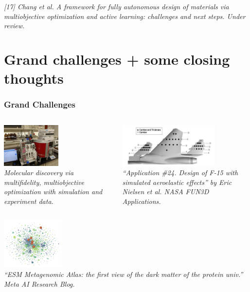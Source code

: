 \documentclass[aspectratio=169]{beamer}
\begin{document}
\begin{frame}
\vfill

{\tiny\it
[17] Chang et al.
A framework for fully autonomous design of materials via multiobjective optimization and active learning: challenges and next steps.
Under review.\\
}

\end{frame}

\section{Grand challenges + some closing thoughts}

\begin{frame}\frametitle{Grand Challenges}

\begin{columns}
\pause
\begin{column}{0.5\textwidth}
\begin{center}
\includegraphics[height=6em]{lab_setup.jpg}\\
{\tiny \sl
Molecular discovery via multifidelity, multiobjective optimization with
simulation and experiment data.\\
}
\end{center}
\end{column}
\pause
\begin{column}{0.5\textwidth}
\begin{center}
\includegraphics[height=6em]{../img/probs/nasa-f15.png}\\
{\tiny \sl
``Application \#24. Design of F-15 with simulated aeroelastic effects''
by Eric Nielsen et al.
NASA FUN3D Applications.\\
}
\end{center}
\end{column}
\end{columns}
\begin{center}
\includegraphics[height=7em]{../img/probs/meta-protein.png}\\
{\tiny \sl
``ESM Metagenomic Atlas: the first view of the dark matter of the protein
univ.''\\
Meta AI Research Blog.\\
}
\end{center}

\end{frame}
\end{document}
